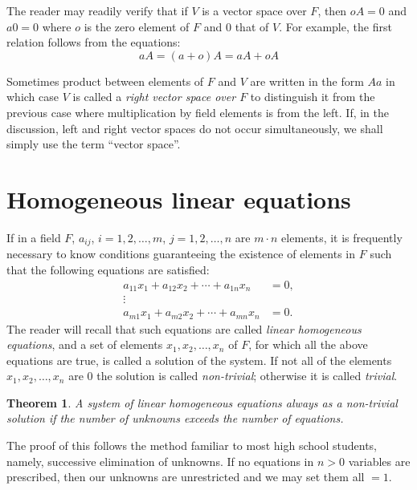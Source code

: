 \documentclass[10pt,leqno,a5paper]{book}
\newtheorem{theo}{Theorem}
\theoremstyle{definition}
\let\htw\section
\begin{document}
The reader may readily verify that if $V$ is a vector space over $F$, then $oA = 0$ and $a0 = 0$ where $o$ is the zero element of $F$ and $0$ that of $V$.
For example, the first relation follows from the equations:
\[
aA = (a + o)A = aA + oA
\]

Sometimes product between elements of $F$ and $V$ are written in the form $Aa$ in which case $V$ is called a \emph{right vector space over $F$} to distinguish it from the previous case where multiplication by field elements is from the left.
If, in the discussion, left and right vector spaces do not occur simultaneously, we shall simply use the term ``vector space''.


\htw{Homogeneous linear equations}

If in a field $F$, $a_{ij}$, $i = 1,2,\ldots,m$, $j = 1,2,\ldots,n$ are $m \cdot n$ elements, it is frequently necessary to know conditions guaranteeing the existence of elements in $F$ such that the following equations are satisfied:
\begin{equation}
\label{eq:on}
\begin{aligned}
a_{11} x_1 + a_{12} x_2 + \cdots + a_{1n} x_n &= 0,
\\
\vdots &
\\
a_{m1} x_1 + a_{m2} x_2 + \cdots + a_{mn} x_n &= 0.
\end{aligned}
\end{equation}
The reader will recall that such equations are called \emph{linear homogeneous equations}, and a set of elements $x_1, x_2, \ldots, x_n$ of $F$, for which all the above equations are true, is called a solution of the system.
If not all of the elements $x_1, x_2, \ldots, x_n$ are $0$ the solution is called \emph{non-trivial}; otherwise it is called \emph{trivial}.


\begin{theo}
\label{theo:on}
A system of linear homogeneous equations always as a non-trivial solution if the number of unknowns exceeds the number of equations.
\end{theo}


The proof of this follows the method familiar to most high school students, namely, successive elimination of unknowns.
If no equations in $n > 0$ variables are prescribed, then our unknowns are unrestricted and we may set them all $= 1$.
\end{document}
